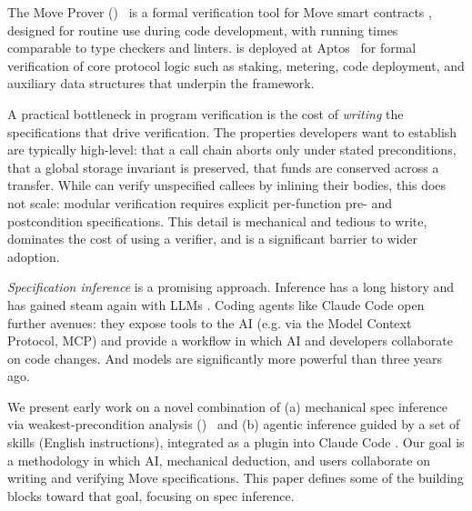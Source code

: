 \label{sec:intro}

The Move Prover (\MVP)~\cite{DillGPQXZ22} is a formal verification tool for Move smart contracts \cite{blackshear2020resources, MoveOnAptosBook}, designed for routine use during code development, with running times comparable to type checkers and linters.
\MVP is deployed at Aptos~\cite{ParkZGXGCLC24, AptosFrameworkBook} for formal verification of core protocol logic such as staking, metering, code deployment, and auxiliary data structures that underpin the framework.

%
A practical bottleneck in program verification is the cost of \emph{writing} the specifications that drive verification.
The properties developers want to establish are typically high-level: that a call chain aborts only under stated preconditions, that a global storage invariant is preserved, that funds are conserved across a transfer.
While \MVP can verify unspecified callees by inlining their bodies, this does not scale: modular verification requires explicit per-function pre- and postcondition specifications.
This detail is mechanical and tedious to write, dominates the cost of using a verifier, and is a significant barrier to wider adoption.

\emph{Specification inference} is a promising approach. Inference has a long history \cite{DaikonTSE01} and has gained steam again with LLMs \cite{PeiEtAl23, KamathEtAl23}.
Coding agents like Claude Code \cite{ClaudeCode} open further avenues: they expose tools to the AI (e.g. via the Model Context Protocol, MCP) and provide a workflow in which AI and developers collaborate on code changes. And models are significantly more powerful than three years ago.

We present early work on a novel combination of (a) mechanical spec inference via weakest-precondition analysis (\WP)~\cite{dijkstra1975wp,BL05} and (b) agentic inference guided by a set of skills (English instructions), integrated as a plugin into Claude Code \cite{ClaudeCodePlugins}.
Our goal is a methodology in which AI, mechanical deduction, and users collaborate on writing and verifying Move specifications.
This paper defines some of the building blocks toward that goal, focusing on spec inference.

